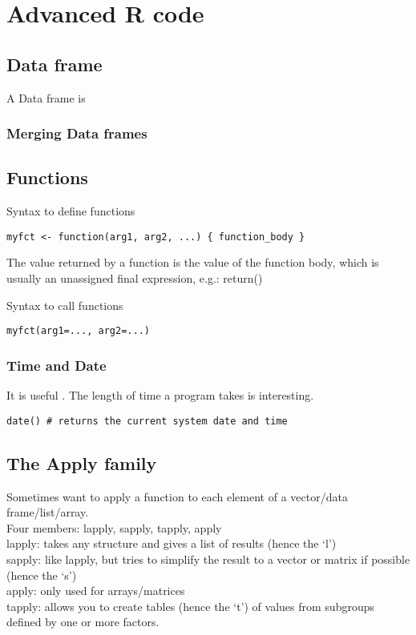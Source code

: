 



\newpage
\chapter{Advanced R code}
\section{Data frame}
A Data frame is
\subsection{Merging Data frames}

\section{Functions}
Syntax to define functions

\begin{framed}
\begin{verbatim}
myfct <- function(arg1, arg2, ...) { function_body }
\end{verbatim}
\end{framed}
The value returned by a function is the value of the function body, which is usually an unassigned final expression, e.g.: return()

Syntax to call functions
\begin{framed}
\begin{verbatim}
myfct(arg1=..., arg2=...)
\end{verbatim}
\end{framed}


\subsection{Time and Date}
It is useful . The length of time a program takes is interesting.


\begin{framed}
\begin{verbatim}
date() # returns the current system date and time
\end{verbatim}
\end{framed}


\section{The Apply family}

Sometimes want to apply a function to each element of a
vector/data frame/list/array.
\\
Four members: lapply, sapply, tapply, apply
\\
lapply: takes any structure and gives a list of results (hence
the `l')
\\
sapply: like lapply, but tries to simplify the result to a
vector or matrix if possible (hence the `s')
\\
apply: only used for arrays/matrices
\\
tapply: allows you to create tables (hence the `t') of values
from subgroups defined by one or more factors.
\newpage

